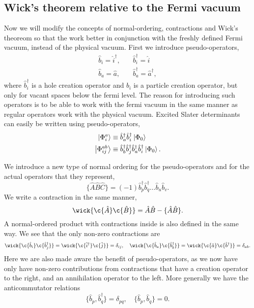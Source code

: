 	\subsection{Wick's theorem relative to the Fermi vacuum}

		Now we will modify the concepts of normal-ordering, contractions and Wick's 
        theoreom so that the work better in conjunction with the freshly defined Fermi
        vacuum, instead of the physical vacuum.
		First we introduce pseudo-operators,
		\begin{equation}
			\begin{aligned}
				\hat{b}_i = \hat{i}^\dagger, &\quad \hat{b}_i^\dagger = \hat{i} \\
				\hat{b}_a = \hat{a}, &\quad \hat{b}_a^\dagger = \hat{a}^\dagger,
			\end{aligned}
		\end{equation}
		where $\hat{b}_i^\dagger$ is a hole creation operator and $\hat{b}_i$ is a particle
		creation operator, but only for vacant spaces below the fermi level. The reason 
		for introducing such operators is to be able to work with the fermi vacuum in the 
        same manner as regular operators work with the physical vacuum.
		Excited Slater determinants can easily be written using pseudo-operators,
		\begin{align}
			\ket{\Phi_i^a} &\equiv \hat{b}_a^\dagger\hat{b}_i^\dagger \ket{\Phi_0} \\
			\ket{\Phi_{ij}^{ab}} &\equiv 
				\hat{b}_b^\dagger \hat{b}_j^\dagger \hat{b}_a^\dagger \hat{b}_i^\dagger 
				\ket{\Phi_0}.
		\end{align}

		We introduce a new type of normal ordering for the pseudo-operators and for the
		actual operators that they represent,
		\begin{equation}
			\{\hat{A}\hat{B}\hat{C} \} 
				= (-1)\hat{b}_p^\dagger\hat{b}_q^\dagger \dots \hat{b}_u \hat{b}_v.
		\end{equation}
		We write a contraction in the same manner,
		\begin{equation}
			\wick{\c{\hat{A}}\c{\hat{B}}} = \hat{A}\hat{B} - \{\hat{A}\hat{B}\}.
		\end{equation}
		A normal-ordered product with contractions inside is also defined in the same 
		way. We see that the only non-zero contractions are
		\begin{equation}
			\wick{\c{\hat{b}_i}\c{\hat{b}_j^\dagger}} =	
			\wick{\c{\hat{i}^\dagger}\c{\hat{j}}} = \delta_{ij}, \quad
			\wick{\c{\hat{b}_a}\c{\hat{b}_b^\dagger}} =
			\wick{\c{\hat{a}}\c{\hat{b}^\dagger}} = \delta_{ab}.
		\end{equation}
        Here we are also made aware the benefit of pseudo-operators, as we now 
        have only have non-zero contributions from contractions that have a creation 
        operator to the right, and an annihilation operator to the left. More generally 
		we have the anticommutator relations
		\begin{equation}
			\{\hat{b}_p, \hat{b}_q^\dagger\} = \delta_{pq}, \quad
			\{\hat{b}_p, \hat{b}_q\} = 0.
		\end{equation}


